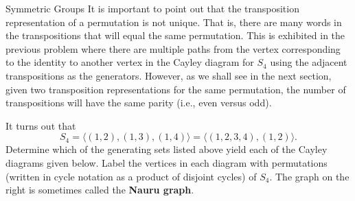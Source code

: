 \begin{section}{Symmetric Groups}
It is important to point out that the transposition representation of a permutation is not unique.  That is, there are many words in the transpositions that will equal the same permutation.  This is exhibited in the previous problem where there are multiple paths from the vertex corresponding to the identity to another vertex in the Cayley diagram for $S_4$ using the adjacent transpositions as the generators.  However, as we shall see in the next section, given two transposition representations for the same permutation, the number of transpositions will have the same parity (i.e., even versus odd).

\begin{problem}\label{prob:Cayley diagrams for S4}
It turns out that
\[
S_4 =\langle (1,2), (1,3), (1,4)\rangle = \langle (1,2,3,4), (1,2)\rangle.
\]
Determine which of the generating sets listed above yield each of the Cayley diagrams given below. Label the vertices in each diagram with permutations (written in cycle notation as a product of disjoint cycles) of $S_4$. The graph on the right is sometimes called the \textbf{Nauru graph}.


\end{problem}
\end{section}
